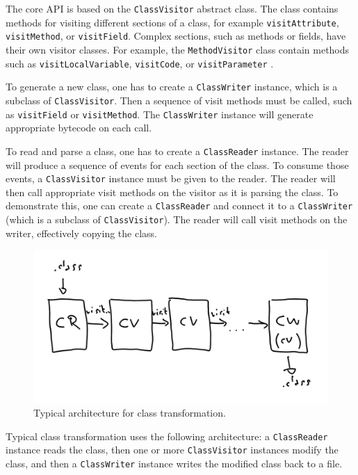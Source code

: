 The core API is based on the \texttt{ClassVisitor} abstract class. The class
contains methods for visiting different sections of a class, for example
\texttt{visitAttribute}, \texttt{visitMethod}, or \texttt{visitField}. Complex
sections, such as methods or fields, have their own visitor classes. For
example, the \texttt{MethodVisitor} class contain methods such as
\texttt{visitLocalVariable}, \texttt{visitCode}, or \texttt{visitParameter}
\cite{asmguide}.

To generate a new class, one has to create a \texttt{ClassWriter} instance,
which is a subclass of \texttt{ClassVisitor}. Then a sequence of visit methods
must be called, such as \texttt{visitField} or \texttt{visitMethod}. The
\texttt{ClassWriter} instance will generate appropriate bytecode on each call.

To read and parse a class, one has to create a \texttt{ClassReader} instance.
The reader will produce a sequence of events for each section of the class. To
consume those events, a \texttt{ClassVisitor} instance must be given to the
reader. The reader will then call appropriate visit methods on the visitor as it
is parsing the class. To demonstrate this, one can create a \texttt{ClassReader}
and connect it to a \texttt{ClassWriter} (which is a subclass of
\texttt{ClassVisitor}). The reader will call visit methods on the writer,
effectively copying the class.

\begin{figure}[hbt]
    \includegraphics[width=\textwidth]{figures/asmschema.png}
    \caption{Typical architecture for class transformation. }
\end{figure}

Typical class transformation uses the following architecture: a
\texttt{ClassReader} instance reads the class, then one or more
\texttt{ClassVisitor} instances modify the class, and then a
\texttt{ClassWriter} instance writes the modified class back to a file.

